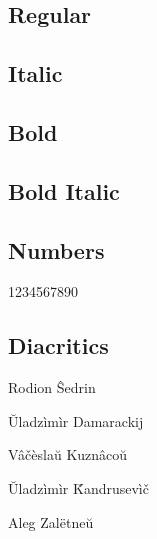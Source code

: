 \documentclass[12pt]{article}
\begin{document}
\sloppy

\subsection*{Regular}
\lipsum[1]

\subsection*{Italic}
\textit{\lipsum[2]} 

\subsection*{Bold}
\textbf{\lipsum[3]}

\subsection*{Bold Italic}

\textbf{\textit{\lipsum[4]}}

\subsection*{Numbers}

1234567890

\subsection*{Diacritics}

\mbox{}\par
Rodion \^{S}edrin 

\u{U}ladz\`{i}m\`{i}r Damarackij

V\^{a}\v{c}\`{e}sla\u{u} Kuzn\^{a}co\u{u}

\u{U}ladz\`{i}m\`{i}r \v{K}andrusev\`{i}\v{c}

Aleg Zal\"{e}tne\u{u}
\end{document}
